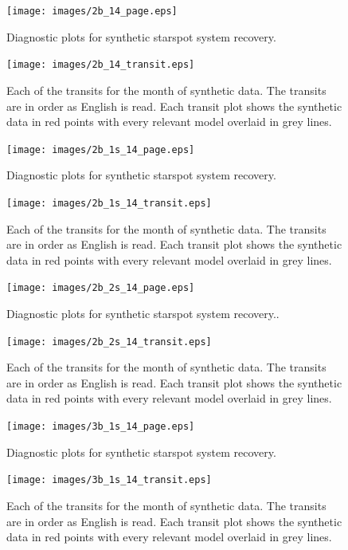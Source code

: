 \clearpage
\begin{figure}
	\texttt{[image: images/2b\_14\_page.eps]}
	\caption{Diagnostic plots for synthetic starspot system recovery.}
	\label{page_2b}
\end{figure}
\clearpage
\begin{figure}
	\texttt{[image: images/2b\_14\_transit.eps]}
	\caption{Each of the transits for the month of synthetic data. The transits are in order as English is read. Each transit plot shows the synthetic data in red points with every relevant model overlaid in grey lines.}
	\label{transits_2b}
\end{figure}

\clearpage
\begin{figure}
	\texttt{[image: images/2b\_1s\_14\_page.eps]}
	\caption{Diagnostic plots for synthetic starspot system recovery.}
	\label{page_2b_1s}
\end{figure}
\clearpage
\begin{figure}
	\texttt{[image: images/2b\_1s\_14\_transit.eps]}
	\caption{Each of the transits for the month of synthetic data. The transits are in order as English is read. Each transit plot shows the synthetic data in red points with every relevant model overlaid in grey lines.}
	\label{transits_2b_1s}
\end{figure}

\clearpage
\begin{figure}
	\texttt{[image: images/2b\_2s\_14\_page.eps]}
	\caption{Diagnostic plots for synthetic starspot system recovery..}
	\label{page_2b_2s}
\end{figure}
\clearpage
\begin{figure}
	\texttt{[image: images/2b\_2s\_14\_transit.eps]}
	\caption{Each of the transits for the month of synthetic data. The transits are in order as English is read. Each transit plot shows the synthetic data in red points with every relevant model overlaid in grey lines.}
	\label{transits_2b_2s}
\end{figure}

\clearpage
\begin{figure}
	\texttt{[image: images/3b\_1s\_14\_page.eps]}
	\caption{Diagnostic plots for synthetic starspot system recovery.}
	\label{page_3b_1s}
\end{figure}
\clearpage
\begin{figure}
	\texttt{[image: images/3b\_1s\_14\_transit.eps]}
	\caption{Each of the transits for the month of synthetic data. The transits are in order as English is read. Each transit plot shows the synthetic data in red points with every relevant model overlaid in grey lines.}
	\label{transits_3b_1s}
\end{figure}